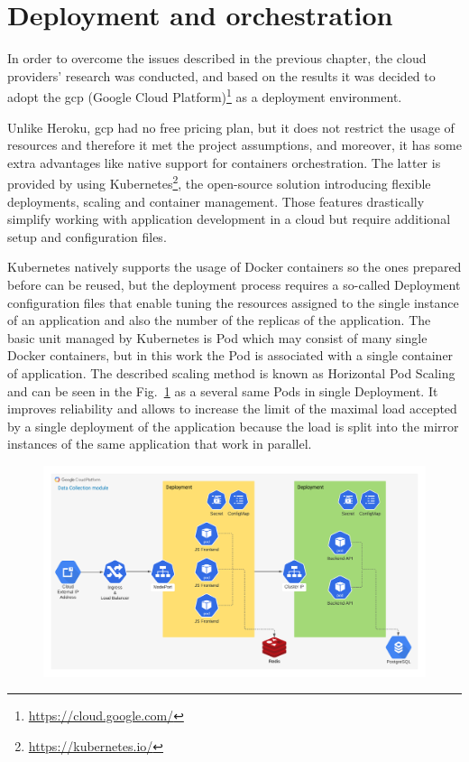 \section{Deployment and orchestration}\label{sec:deployment-and-orchestration}
In order to overcome the issues described in the previous chapter, the cloud providers' research was conducted, and based on the results it was decided to adopt the \gls{gcp} (Google Cloud Platform)\footnote{\url{https://cloud.google.com/}} as a deployment environment.

Unlike Heroku, \gls{gcp} had no free pricing plan, but it does not restrict the usage of resources and therefore it met the project assumptions, and moreover, it has some extra advantages like native support for containers orchestration.
The latter is provided by using Kubernetes\footnote{\url{https://kubernetes.io/}}, the open-source solution introducing flexible deployments, scaling and container management.
Those features drastically simplify working with application development in a cloud but require additional setup and configuration files.

Kubernetes natively supports the usage of Docker containers so the ones prepared before can be reused, but the deployment process requires a so-called Deployment configuration files that enable tuning the resources assigned to the single instance of an application and also the number of the replicas of the application.
The basic unit managed by Kubernetes is Pod which may consist of many single Docker containers, but in this work the Pod is associated with a single container of application.
The described scaling method is known as Horizontal Pod Scaling and can be seen in the Fig.~\ref{fig:gcp_diagram} as a several same Pods in single Deployment.
It improves reliability and allows to increase the limit of the maximal load accepted by a single deployment of the application because the load is split into the mirror instances of the same application that work in parallel.

\begin{figure}
    \includegraphics[width=\linewidth]{resources/gcp_diagram}
    \label{fig:gcp_diagram}
\end{figure}

